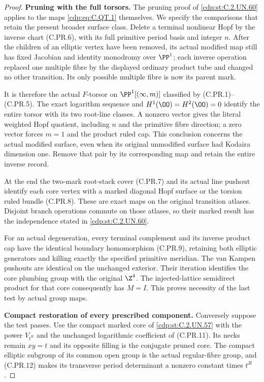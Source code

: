 \begin{proof}
\par\medskip\noindent\textbf{Pruning with the full torsors.}
The pruning proof of \ref{cdp:st:C.2.UN.60} applies to the
maps \eqref{cdp:eq:C.QT.1} themselves. We specify the
comparisons that retain the present
broader surface class. Delete a terminal
nonlinear Hopf by the inverse chart
(C.PR.6), with its full primitive period
basis and integer $n$. After the children
of an elliptic vertex have been removed,
its actual modified map still has fixed
Jacobian and identity monodromy over
$\PP^1$; each inverse operation replaced
one multiple fibre by the displayed
ordinary product tube and changed no
other transition. Its only possible
multiple fibre is now its parent mark.

It is therefore the actual $F$-torsor
on $\PP^1[(\infty,m)]$ classified by
(C.PR.1)--(C.PR.5). The exact logarithm
sequence and $H^1(\OO)=H^2(\OO)=0$
identify the entire torsor with its
two root-line classes. A nonzero
vector gives the literal weighted
Hopf quotient, including $n$ and
the primitive fibre direction;
a zero vector forces $m=1$ and
the product ruled cap. This conclusion
concerns the actual modified surface,
even when its original unmodified
surface had Kodaira dimension one.
Remove that pair by its corresponding
map and retain the entire inverse
record.

At the end the two-mark root-stack
cover (C.PR.7) and its actual line
pushout identify each core vertex
with a marked diagonal Hopf surface
or the torsion ruled bundle (C.PR.8).
These are exact maps on the original
transition atlases. Disjoint branch
operations commute on those atlases,
so their marked result has the
independence stated in \ref{cdp:st:C.2.UN.60}.

For an actual degeneration, every
terminal complement and its inverse
product cap have the identical
boundary homomorphism (C.PR.9),
retaining both elliptic generators
and killing exactly the specified
primitive meridian. The van Kampen
pushouts are identical on the
unchanged exterior. Their iteration
identifies the core plumbing group
with the original $\Z^4$. The
injected-lattice semidirect product
for that core consequently has
$M=I$. This proves necessity of
the last test by actual group maps.

\par\medskip\noindent\textbf{Compact restoration of every prescribed component.}
Conversely suppose the test passes.
Use the compact marked core of \ref{cdp:st:C.2.UN.57}
with the power $V_{t^R}$ and the
unchanged logarithmic coefficient
of (C.PR.11). Its necks remain
$xy=t$ and its opposite filling
is the conjugate pruned core.
The compact elliptic subgroup of
its common open group is the
actual regular-fibre group, and
(C.PR.12) makes its transverse
period determinant a nonzero
constant times $t^R$.


\end{proof}
